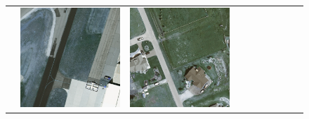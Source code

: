 \begin{figure}[H]
\begin{tabularx}{\textwidth}{c|*{9}{X}}
    &  \includegraphics[trim={650pt 120pt 170pt 720pt},clip,width=\linewidth]{images/015Results/02perm_exp/comp_images/ground_truth/487.png}
    & \includegraphics[trim={230pt 200pt 680pt 725pt},clip,width=\linewidth]{images/015Results/02perm_exp/comp_images/ground_truth/509.png}

\end{tabularx}
\end{figure}
